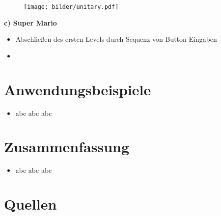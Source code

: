 \begin{frame}
    \begin{figure}[ht]
      \centering	      
      \texttt{[image: bilder/unitary.pdf]}
      \label{gccpy1a}
    \end{figure}
\end{frame}

\begin{frame}
   \textbf{c) Super Mario}
   
   \begin{itemize}
    \item Abschließen des ersten Levels durch Sequenz von Button-Eingaben 
    \item
   \end{itemize}
   
\end{frame}


  
    \section{Anwendungsbeispiele}
    
    \begin{frame}
    \begin{itemize}
      \item abc abc abc
    \end{itemize}
    \end{frame}
    
    \section{Zusammenfassung}
     \begin{itemize}
      \item abc abc abc
    \end{itemize}
    
    \section{Quellen}
    
    
    
    



